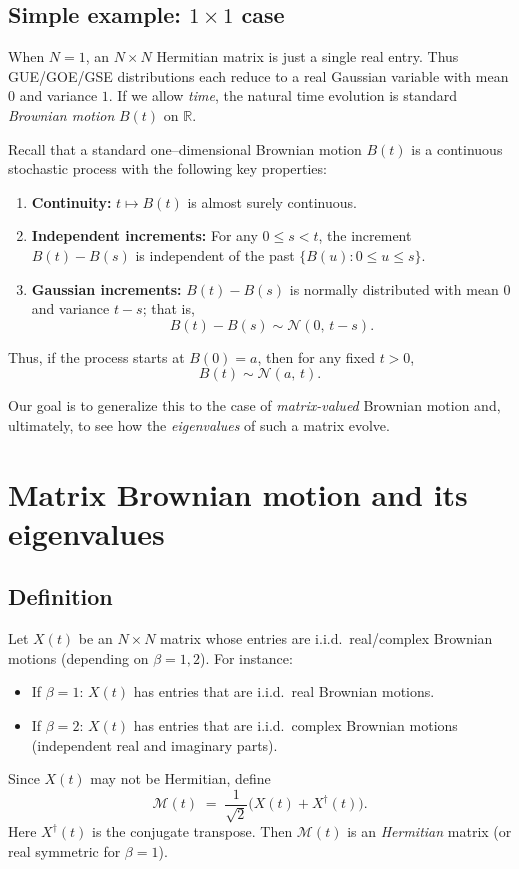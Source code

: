 \documentclass[letterpaper,11pt,oneside,reqno]{article}
\numberwithin{equation}{section}
\theoremstyle{definition}
\begin{document}
\subsection{Simple example: $1\times1$ case}
When $N=1$, an $N\times N$ Hermitian matrix is just a single real entry. Thus GUE/GOE/GSE distributions each reduce to a real Gaussian variable with mean $0$ and variance $1$. If we allow \emph{time}, the natural time evolution is standard \emph{Brownian motion} $B(t)$ on $\mathbb{R}$.

Recall that a standard one--dimensional Brownian motion \(B(t)\) is a continuous stochastic process with the following key properties:
\begin{enumerate}
    \item \textbf{Continuity:} \(t\mapsto B(t)\) is almost surely continuous.
    \item \textbf{Independent increments:} For any \(0\leq s < t\), the increment \(B(t)-B(s)\) is independent of the past \(\{B(u): 0\le u \le s\}\).
    \item \textbf{Gaussian increments:} \(B(t)-B(s)\) is normally distributed with mean \(0\) and variance \(t-s\); that is,
    \[
    B(t)-B(s) \sim \mathcal{N}(0,\,t-s).
    \]
\end{enumerate}
Thus, if the process starts at \(B(0)=a\), then for any fixed \(t>0\),
\[
B(t)\sim \mathcal{N}(a,\,t).
\]

Our goal is to generalize this to the case of \emph{matrix-valued} Brownian motion and, ultimately, to see how the \emph{eigenvalues} of such a matrix evolve.

\section{Matrix Brownian motion and its eigenvalues}
\label{sec:matrix_BM}

\subsection{Definition}
Let $X(t)$ be an $N\times N$ matrix whose entries are i.i.d.\ real/complex Brownian motions (depending on $\beta=1,2$). For instance:
\begin{itemize}
\item If $\beta=1$: $X(t)$ has entries that are i.i.d.\ real Brownian motions.
\item If $\beta=2$: $X(t)$ has entries that are i.i.d.\ complex Brownian motions (independent real and imaginary parts).
\end{itemize}
Since $X(t)$ may not be Hermitian, define
\[
	\mathcal{M}(t) \;=\; \frac{1}{\sqrt{2}}\bigl(X(t) + X^\dagger(t)\bigr).
\]
Here $X^\dagger(t)$ is the conjugate transpose. Then $\mathcal{M}(t)$ is an \emph{Hermitian} matrix (or real symmetric for $\beta=1$).
\end{document}
